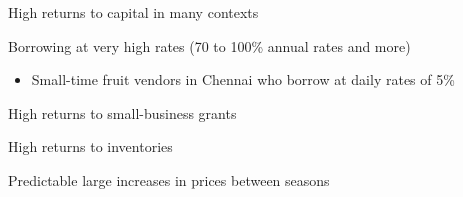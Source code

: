 \documentclass[aspectratio=169, 10pt, handout]{beamer}
\newenvironment{wideitemize}{\itemize\addtolength{\itemsep}{10pt}}{\enditemize}
\begin{document}
\begin{frame}{High returns to capital in many contexts \cite{banerjee2005growth}}

\begin{wideitemize}

	\item Borrowing at very high rates (70 to 100\% annual rates and more)
	
	\begin{itemize}
	
		\item Small-time fruit vendors in Chennai who borrow at daily rates of 5\% \citep{karlan2018debt}
		

	\end{itemize}

	\item High returns to small-business grants \citep{de2008capital}
	
	\item High returns to inventories \citep{kremer2013behavioral}
	
	\item Predictable large increases in prices between seasons \citep{burke2018sell}
	
\end{wideitemize}


\end{frame}
\end{document}
